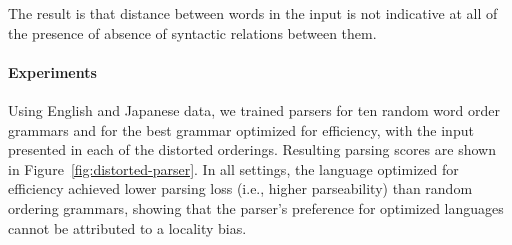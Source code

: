 \documentclass[10pt,twoside,lineno]{article}
\begin{document}
The result is that distance between words in the input is not indicative at all of the presence of absence of syntactic relations between them.

\paragraph{Experiments}
Using English and Japanese data, we trained parsers for ten random word order grammars and for the best grammar optimized for efficiency, with the input presented in each of the distorted orderings.
Resulting parsing scores are shown in Figure~\ref{fig:distorted-parser}.
In all settings, the language optimized for efficiency achieved lower parsing loss (i.e., higher parseability) than random ordering grammars, showing that the parser's preference for optimized languages cannot be attributed to a locality bias.
\end{document}
